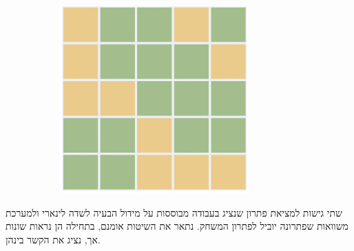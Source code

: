 \documentclass[12pt,leqno]{article}
\theoremstyle{theoremdd}
\begin{document}
\begin{figure}[ht]
\begin{subfigure}[b]{.25\linewidth}
    \end{subfigure}
    \begin{subfigure}[b]{.25\linewidth}
    \includegraphics[width=0.95\linewidth]{images/5x5_sol.PNG}
    \end{subfigure}
\end{figure}

שתי גישות למציאת פתרון שנציג בעבודה מבוססות
על מידול הבעיה לשדה לינארי ולמערכת משוואות שפתרונה יוביל לפתרון המשחק.
נתאר את השיטות אומנם, בתחילה הן נראות שונות אך,
נציג את הקשר בינהן.

\newpage
\end{document}
